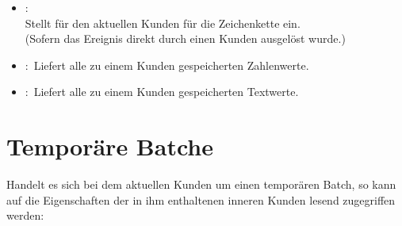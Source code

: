 \begin{itemize}
\item
{}:\\
Stellt für den aktuellen Kunden für  die Zeichenkette  ein.\\
(Sofern das Ereignis direkt durch einen Kunden ausgelöst wurde.)

\item
{}:\
Liefert alle zu einem Kunden gespeicherten Zahlenwerte.
  
\item
{}:\
Liefert alle zu einem Kunden gespeicherten Textwerte.

\end{itemize}

\section{Temporäre Batche}

Handelt es sich bei dem aktuellen Kunden um einen temporären Batch, so kann auf die
Eigenschaften der in ihm enthaltenen inneren Kunden lesend zugegriffen werden:

